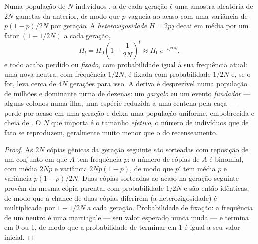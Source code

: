 \begin{theorem}\label{thm:b2:population-genetics:drift}
Numa população de $N$ indivíduos , a  de cada
geração é uma amostra aleatória de $2N$ gametas da anterior, de modo que
$p$ vagueia ao acaso com uma variância de
$p(1 - p)/2N$ por geração. A \emph{heterozigosidade} $H = 2pq$
decai em média por um fator $(1 - 1/2N)$ a cada geração,
\[
H_t = H_0\left(1 - \frac{1}{2N}\right)^{t} \approx H_0\,e^{-t/2N},
\]
e todo  acaba perdido ou \emph{fixado}, com probabilidade igual à
sua frequência atual: uma nova  neutra, com frequência $1/2N$, é
fixada com probabilidade $1/2N$ e, se o for, leva cerca de $4N$ gerações
para isso. A deriva é desprezível numa população de milhões e dominante
numa de dezenas: um \emph{gargalo} ou um evento \emph{fundador} --- alguns
colonos numa ilha, uma espécie reduzida a uma centena pela caça ---
perde  por acaso em uma geração e deixa uma população uniforme,
empobrecida e cheia de . O $N$ que importa é o tamanho
\emph{efetivo}, o número de indivíduos que de fato se reproduzem,
geralmente muito menor que o do recenseamento.
\end{theorem}
\begin{proof}
As $2N$ cópias gênicas da geração seguinte são sorteadas com reposição
de um conjunto em que $A$ tem frequência $p$: o número de cópias de $A$
é binomial, com média $2Np$ e variância $2Np(1 - p)$, de modo que $p'$
tem média $p$ e variância $p(1 - p)/2N$. Duas cópias sorteadas ao acaso
na geração seguinte provêm da mesma cópia parental com probabilidade
$1/2N$ e são então idênticas, de modo que a chance de duas cópias
diferirem (a heterozigosidade) é multiplicada por $1 - 1/2N$ a cada
geração. Probabilidade de fixação: a frequência de um  neutro é uma
martingale --- seu valor esperado nunca muda --- e termina em 0 ou 1, de
modo que a probabilidade de terminar em 1 é igual a seu valor inicial.
\end{proof}

